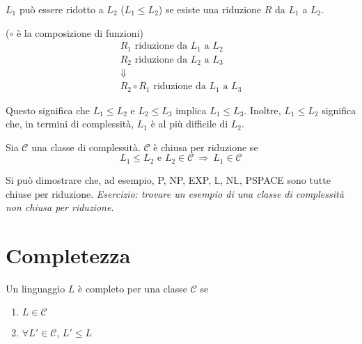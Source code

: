 \begin{definition}[$L_1\leq L_2$]
    $L_1$ può essere ridotto a $L_2$ ($L_1\leq L_2$) se esiste una riduzione $R$ da $L_1$ a $L_2$.
\end{definition}

\begin{property} ($\circ$ è la composizione di funzioni)
    \begin{eqnarray*}
        &R_1 \text{ riduzione da } L_1 \text{ a } L_2&\\
        &R_2 \text{ riduzione da } L_2 \text{ a } L_3&\\
        &\Downarrow&\\
        &R_2\circ R_1 \text{ riduzione da } L_1 \text{ a } L_3&
    \end{eqnarray*}
\end{property}
Questo significa che $L_1\leq L_2$ e $L_2\leq L_3$ implica $L_1\leq L_3$. Inoltre, $L_1\leq L_2$ significa che, in termini di complessità, $L_1$ è al più difficile di $L_2$.

\begin{definition}
    Sia $\mathcal{C}$ una classe di complessità. $\mathcal{C}$ è chiusa per riduzione se
    $$
        L_1\leq L_2 \text{ e } L_2\in\mathcal{C} ~\Rightarrow~ L_1\in\mathcal{C}
    $$
\end{definition}
Si può dimostrare che, ad esempio, P, NP, EXP, $\mathbb{L}$, N$\mathbb{L}$, PSPACE sono tutte chiuse per riduzione. \emph{Esercizio: trovare un esempio di una classe di complessità non chiusa per riduzione.}


\section{Completezza}

\begin{definition}
    Un linguaggio $L$ è completo per una classe $\mathcal{C}$ se
    \begin{enumerate}
        \item $L\in\mathcal{C}$
        \item $\forall L'\in\mathcal{C}$, $L'\leq L$
    \end{enumerate}    
\end{definition}

\begin{center}
\end{center}

